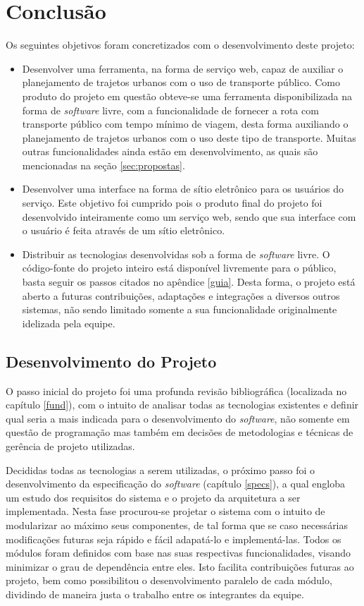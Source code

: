 \chapter{Conclusão}
Os seguintes objetivos foram concretizados com o desenvolvimento deste projeto:

\begin{itemize}
	\item Desenvolver uma ferramenta, na forma de serviço web, capaz de auxiliar o planejamento de trajetos urbanos com o uso de transporte público.
Como produto do projeto em questão obteve-se uma ferramenta disponibilizada na forma de \emph{software} livre, com a funcionalidade de fornecer a rota com transporte público com tempo mínimo de viagem, desta forma auxiliando o planejamento de trajetos urbanos com o uso deste tipo de  transporte.
Muitas outras funcionalidades ainda estão em desenvolvimento, as quais são mencionadas na seção \ref{sec:propostas}.
	\item Desenvolver uma interface na forma de sítio eletrônico para os usuários do serviço.
Este objetivo foi cumprido pois o produto final do projeto foi desenvolvido inteiramente como um serviço web, sendo que sua interface com o usuário é feita através de um sítio eletrônico.
	\item Distribuir as tecnologias desenvolvidas sob a forma de \emph{software} livre.
O código-fonte do projeto inteiro está disponível livremente para o público, basta seguir os passos citados no apêndice \ref{guia}.
Desta forma, o projeto está aberto a futuras contribuições, adaptações e integrações a diversos outros sistemas, não sendo limitado somente a sua funcionalidade originalmente idelizada pela equipe.
\end{itemize}

\section{Desenvolvimento do Projeto}
O passo inicial do projeto foi uma profunda revisão bibliográfica (localizada no capítulo \ref{fund}), com o intuito de analisar todas as tecnologias existentes e definir qual seria a mais indicada para o desenvolvimento do \emph{software}, não somente em questão de programação mas também em decisões de metodologias e técnicas de gerência de projeto utilizadas.

Decididas todas as tecnologias a serem utilizadas, o próximo passo foi o desenvolvimento da especificação do \emph{software} (capítulo \ref{specs}), a qual engloba um estudo dos requisitos do sistema e o projeto da arquitetura a ser implementada.
Nesta fase procurou-se projetar o sistema com o intuito de modularizar ao máximo seus componentes, de tal forma que se caso necessárias modificações futuras seja rápido e fácil adapatá-lo e implementá-las.
Todos os módulos foram definidos com base nas suas respectivas funcionalidades, visando minimizar o grau de dependência entre eles. 
Isto facilita contribuições futuras ao projeto, bem como possibilitou o desenvolvimento paralelo de cada módulo, dividindo de maneira justa o trabalho entre os integrantes da equipe.

